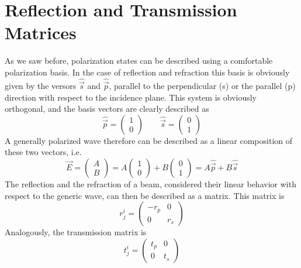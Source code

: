 \documentclass[../electromagnetism.tex]{subfiles}
\begin{document}
\section{Reflection and Transmission Matrices}
As we saw before, polarization states can be described using a comfortable polarization basis. In the case of reflection and refraction this basis is obviously given by the versors $\hat{\vec{s}}$ and $\hat{\vec{p}}$, parallel to the perpendicular (s) or the parallel (p) direction with respect to the incidence plane. This system is obviously orthogonal, and the basis vectors are clearly described as
\begin{equation}
	\hat{\vec{p}}=\begin{pmatrix}
		1\\0
	\end{pmatrix}\qquad\hat{\vec{s}}=\begin{pmatrix}
		0\\1
	\end{pmatrix}
	\label{eq:reflrefrbasis.rjon}
\end{equation}
A generally polarized wave therefore can be described as a linear composition of these two vectors, i.e.
\begin{equation*}
	\vec{E}=\begin{pmatrix}
		A\\B
	\end{pmatrix}=A\begin{pmatrix}
		1\\0
	\end{pmatrix}+B\begin{pmatrix}
		0\\1
	\end{pmatrix}=A\hat{\vec{p}}+B\hat{\vec{s}}
\end{equation*}
The reflection and the refraction of a beam, considered their linear behavior with respect to the generic wave, can then be described as a matrix. This matrix is 
\begin{equation}
	r^i_j=\begin{pmatrix}
		-r_p&0\\
		0&r_s
	\end{pmatrix}
	\label{eq:refmatrix.rjon}
\end{equation}
Analogously, the transmission matrix is
\begin{equation}
	t^i_j=\begin{pmatrix}
		t_p&0\\
		0&t_s
	\end{pmatrix}
	\label{eq:transmatrix.rjon}
\end{equation}
\end{document}
